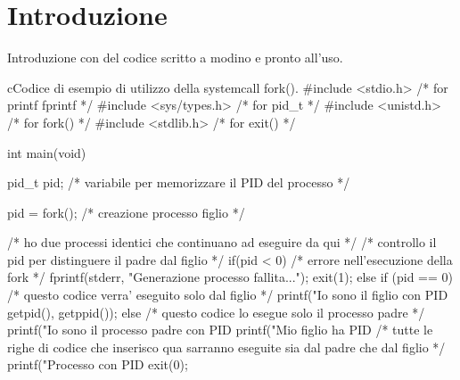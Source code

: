 \documentclass[a4paper, italian, 10pt, twoside, open=right]{scrbook}
\begin{document}
\maketitle
\frontmatter
\hypersetup{linkcolor=black}
\setcounter{tocdepth}{2}
\tableofcontents



\mainmatter
\chapter{Introduzione}

Introduzione con del codice scritto a modino e pronto all'uso.

\begin{mintedcodebox}{c}{Codice di esempio di utilizzo della systemcall fork().}
#include <stdio.h>      /* for printf fprintf */
#include <sys/types.h>  /* for pid_t */
#include <unistd.h>     /* for fork() */
#include <stdlib.h>     /* for exit() */

int main(void) {

  pid_t pid;     /* variabile per memorizzare il PID del processo */

  pid = fork();  /* creazione processo figlio */

  /* ho due processi identici che continuano ad eseguire da qui */
  /* controllo il pid per distinguere il padre dal figlio */
  if(pid < 0){
    /* errore nell’esecuzione della fork */
    fprintf(stderr, "Generazione processo fallita...");
    exit(1);
  }else if (pid == 0){
    /* questo codice verra’ eseguito solo dal figlio */
    printf("Io sono il figlio con PID %
            getpid(), getppid());
  }else {
      /* questo codice lo esegue solo il processo padre */
      printf("Io sono il processo padre con PID %
      printf("Mio figlio ha PID %
  }
  /* tutte le righe di codice che inserisco qua sarranno eseguite
    sia dal padre che dal figlio */
  printf("Processo con PID %
  exit(0);
}
\end{mintedcodebox}
\end{document}
